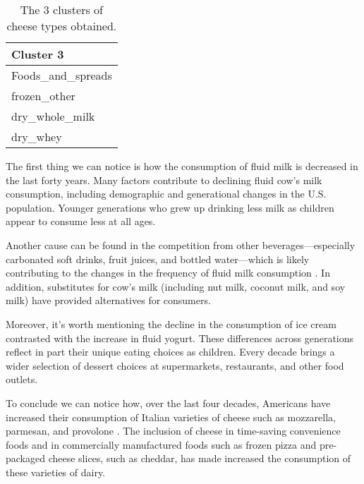 \begin{table}[htpb]
    \begin{minipage}[t]{.3\linewidth}
        \centering
        \medskip
        \begin{tabular}{l}
            \toprule
            Cluster 3\\
            \midrule
            Foods\_and\_spreads\\
            frozen\_other\\
            dry\_whole\_milk\\
            dry\_whey\\
            \bottomrule                      
        \end{tabular}
    \end{minipage} 
    \caption{The 3 clusters of cheese types obtained.}
    \label{tab:cluster}
\end{table}


The first thing we can notice is how the consumption of fluid milk is decreased in the last forty years. Many factors contribute to declining fluid cow's milk consumption, including demographic and generational changes in the U.S. population. Younger generations who grew up drinking less milk as children appear to consume less at all ages.

Another cause can be found in the competition from other beverages—especially carbonated soft drinks, fruit juices, and bottled water—which is likely contributing to the changes in the frequency of fluid milk consumption \cite{Trends_chees}. In addition, substitutes for cow's milk (including nut milk, coconut milk, and soy milk) have provided alternatives for consumers.

Moreover, it's worth mentioning the decline in the consumption of ice cream contrasted with the increase in fluid yogurt. These differences across generations reflect in part their unique eating choices as children. Every decade brings a wider selection of dessert choices at supermarkets, restaurants, and other food outlets.

To conclude we can notice how, over the last four decades, Americans have increased their consumption of Italian varieties of cheese such as mozzarella, parmesan, and provolone \cite{Trends_chees}. The inclusion of cheese in time-saving convenience foods and in commercially manufactured foods such as frozen pizza and pre-packaged cheese slices, such as cheddar, has made increased the consumption of these varieties of dairy.




